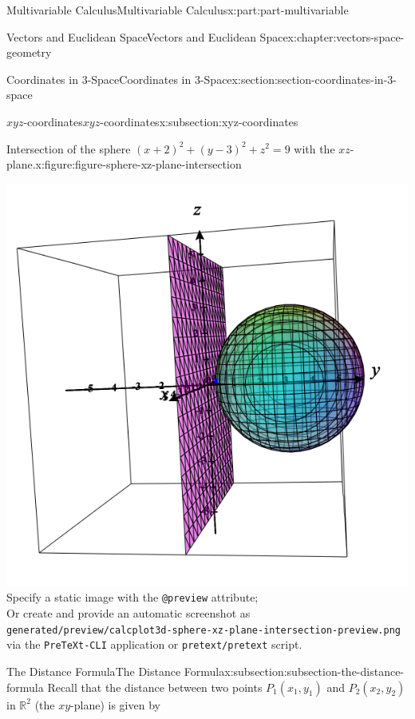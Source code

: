 \documentclass[twoside,10pt,]{tufte-book}
\newcommand{\mono}[1]{\texttt{#1}}
\numberwithin{equation}{part}
\newlength{\qrsize}
\newlength{\previewwidth}
\newcommand{\RR}{\mathbb{R}}
\begin{document}
\begin{partptx}{Multivariable Calculus}{}{Multivariable Calculus}{}{}{x:part:part-multivariable}
\begin{chapterptx}{Vectors and Euclidean Space}{}{Vectors and Euclidean Space}{}{}{x:chapter:vectors-space-geometry}
\begin{sectionptx}{Coordinates in 3-Space}{}{Coordinates in 3-Space}{}{}{x:section:section-coordinates-in-3-space}
\begin{subsectionptx}{\(xyz\)-coordinates}{}{\(xyz\)-coordinates}{}{}{x:subsection:xyz-coordinates}
\begin{figureptx}{Intersection of the sphere \((x+2)^2 + (y-3)^2 + z^2 = 9\) with the \(xz\)-plane.}{x:figure:figure-sphere-xz-plane-intersection}{}
\begin{tcbraster}[raster columns=2, raster column skip=1pt, raster halign=center, raster force size=false, raster left skip=0pt, raster right skip=0pt]
\begin{tcolorbox}[previewstyle, width=\previewwidth]
{\includegraphics[width=0.80\linewidth,height=\qrsize,keepaspectratio]{generated/preview/calcplot3d-sphere-xz-plane-intersection-preview.png}}%
{\small{}Specify a static image with the \mono{@preview} attribute;\\%
Or create and provide an automatic screenshot as\\%
\mono{generated/preview/calcplot3d-sphere-xz-plane-intersection-preview.png}\\%
via the \mono{PreTeXt-CLI} application or \mono{pretext/pretext} script.}%
\end{tcolorbox}%
\begin{tcolorbox}[qrstyle]%
{\hypersetup{urlcolor=black}}%
\end{tcolorbox}%
\end{tcbraster}%
\tcblower
\end{figureptx}%
\end{subsectionptx}
%
%
\typeout{************************************************}
\typeout{************************************************}
%
\begin{subsectionptx}{The Distance Formula}{}{The Distance Formula}{}{}{x:subsection:subsection-the-distance-formula}
Recall that the distance between two points \(P_{1}(x_{1},y_{1})\) and \(P_{2}(x_{2},y_{2})\) in \(\RR^{2}\) (the \(xy\)-plane) is given by%
%

\end{subsectionptx}
\end{sectionptx}
\end{chapterptx}
\end{partptx}
\end{document}
